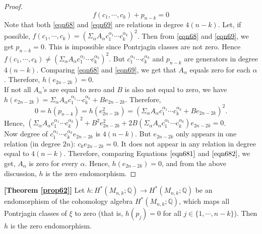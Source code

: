 \documentclass[a4paper,leqno,12pt]{amsart}
\theoremstyle{plain}
\theoremstyle{definition}
\theoremstyle{remark}
\newcommand{\Q}{\mathbb{Q}}
\begin{document}
{\begin{proof}
\begin{equation}
f(c_{1},  \cdots ,  c_{k}) + p_{n-k} = 0
\label{eqn69}
\end{equation}
\noindent
Note that both \ref{eqn68} and \ref{eqn69} are relations in degree $4(n-k)$.  
Let,  if possible,  $f(c_{1},  \cdots ,  c_{k}) = (\Sigma_{\alpha} A_{\alpha} c_{1}^{\alpha_{1}} \cdots c_{k}^{\alpha_{k}} )^{2}$.  Then from \ref{eqn68} and \ref{eqn69},  we get $p_{n-k} =0$. This is impossible since Pontrjagin classes are not zero.  Hence $f(c_{1},  \cdots ,  c_{k}) \neq (\Sigma_{\alpha} A_{\alpha} c_{1}^{\alpha_{1}} \cdots c_{k}^{\alpha_{k}} )^{2}$.   But $c_{1}^{\alpha_{1}} \cdots c_{k}^{\alpha_{k}}$ and $p_{n-k}$ are generators in degree $4(n-k)$.  Comparing \ref{eqn68} and \ref{eqn69},  we get that $A_{\alpha}$ equals zero for each $\alpha $.  Therefore,  $h(e_{2n-2k}) = 0$.  \\
\noindent
If not all $A_{\alpha}$'s are equal to zero and $B$ is also not equal to zero,  we have \\
 $h(e_{2n-2k}) = \Sigma_{\alpha} A_{\alpha} c_{1}^{\alpha_{1}} \cdots c_{k}^{\alpha_{k}} + Be_{2n-2k}$.  
 Therefore,  
  \begin{equation}
  \label{eqn682}
  0 = h(p_{n-k}) = h(e_{2n-2k}^{2}) = 
(\Sigma_{\alpha} A_{\alpha} c_{1}^{\alpha_{1}} \cdots c_{k}^{\alpha_{k}} + Be_{2n-2k})^{2}.
\end{equation}
Hence,   
$ (\Sigma_{\alpha}A_{\alpha} c_{1}^{\alpha_{1}} \cdots c_{k}^{\alpha_{k}})^{2} + B^{2} e_{2n-2k}^{2} + 2B (\Sigma_{\alpha} A_{\alpha} c_{1}^{\alpha_{1}} \cdots c_{k}^{\alpha_{k}}) e_{2n-2k} = 0$.  \\
Now degree of $c_{1}^{\alpha_{1}} \cdots c_{k}^{\alpha_{k}} e_{2n-2k}$ is $4(n-k)$.  But $e_{2n-2k}$  only appears in one relation (in degree $2n$): $c_{k} e_{2n-2k} = 0$.  It does not appear in any relation in degree equal to $4(n-k)$.  Therefore,  comparing Equations $\ref{eqn681}$ and $\ref{eqn682}$,  we get,  $A_{\alpha}$ is zero for every $\alpha$.  
Hence,  $h(e_{2n-2k}) = 0$,  and from the above discussion,  $h$ is the zero endomorphism.  

\end{proof}
  
 
 \begin{myprop}  {\bf [Theorem \ref{prop62}]} %
 Let $h \colon H^{*} (M_{n,k} ; \Q) \rightarrow H^{*} (M_{n,k} ; \Q)$ be an endomorphism of the cohomology algebra   $H^{*} (M_{n,k} ; \Q)$,  which maps all Pontrjagin classes of $\xi$ to zero (that is,  $h(p_{j}) = 0$ for all $j \in \{1,  \cdots ,  n-k \}$).  Then $h$ is the zero endomorphism.  
\end{myprop}
 
}
\end{document}
